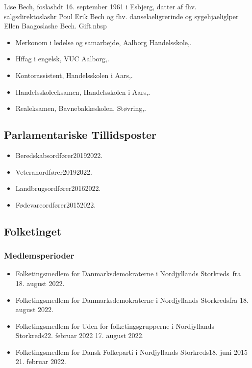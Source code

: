 \documentclass[11pt, a4paper]{awesome-cv}
\begin{document}
\makecvheader[R]
\makelettertitle
\begin{cvletter}
Lise Bech, foslashdt 16. september 1961 i Esbjerg, datter af fhv. salgsdirektoslashr Poul Erik Bech og fhv. danselaeligrerinde og sygehjaeliglper Ellen Baagoslashe Bech. Gift.nbsp

\begin{itemize}
\item Merkonom i ledelse og samarbejde, Aalborg Handelsskole,.
\item Hffag i engelsk, VUC Aalborg,.
\item Kontorassistent, Handelsskolen i Aars,.
\item Handelsskoleeksamen, Handelsskolen i Aars,.
\item Realeksamen, Bavnebakkeskolen, Støvring,.
\end{itemize}
\subsection*{Parlamentariske Tillidsposter}
\begin{itemize}
\item Beredskabsordfører20192022.
\item Veteranordfører20192022.
\item Landbrugsordfører20162022.
\item Fødevareordfører20152022.
\end{itemize}
\subsection*{Folketinget}
\subsubsection*{Medlemsperioder}
\begin{itemize}
\item Folketingsmedlem for Danmarksdemokraterne i Nordjyllands Storkreds fra 18. august 2022.
\item Folketingsmedlem for Danmarksdemokraterne i Nordjyllands Storkredsfra 18. august 2022.
\item Folketingsmedlem for Uden for folketingsgrupperne i Nordjyllands Storkreds22. februar 2022  17. august 2022.
\item Folketingsmedlem for Dansk Folkeparti i Nordjyllands Storkreds18. juni 2015  21. februar 2022.
\end{itemize}

\end{cvletter}
\end{document}

